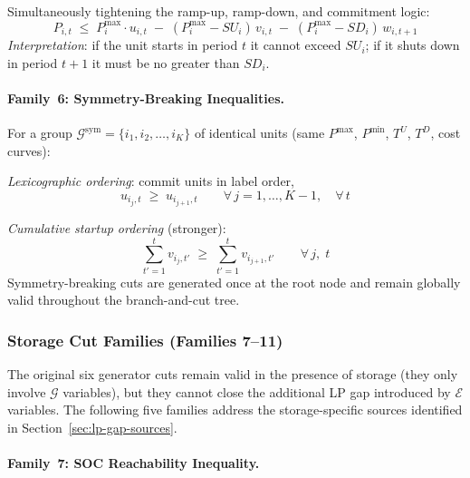 Simultaneously tightening the ramp-up, ramp-down, and commitment logic:
\begin{equation}\label{eq:cut-3period}
  \boxed{
    P_{i,t}
    \;\leq\;
    P^{\max}_i \cdot u_{i,t}
    \;-\; (P^{\max}_i - SU_i)\,v_{i,t}
    \;-\; (P^{\max}_i - SD_i)\,w_{i,t+1}
  }
\end{equation}
\textit{Interpretation}: if the unit starts in period $t$ it cannot exceed $SU_i$;
if it shuts down in period $t+1$ it must be no greater than $SD_i$.

\paragraph{Family~6: Symmetry-Breaking Inequalities.}

For a group $\mathcal{G}^{\mathrm{sym}} = \{i_1, i_2, \ldots, i_K\}$ of
identical units (same $P^{\max}$, $P^{\min}$, $T^U$, $T^D$, cost curves):

\emph{Lexicographic ordering}: commit units in label order,
\begin{equation}\label{eq:cut-sym-lex}
  u_{i_j,t} \;\geq\; u_{i_{j+1},t}
  \qquad \forall\, j=1,\ldots,K-1,\quad \forall\, t
\end{equation}

\emph{Cumulative startup ordering} (stronger):
\begin{equation}\label{eq:cut-sym-cumstart}
  \sum_{t'=1}^{t} v_{i_j,t'} \;\geq\; \sum_{t'=1}^{t} v_{i_{j+1},t'}
  \qquad \forall\, j,\; t
\end{equation}
Symmetry-breaking cuts are generated once at the root node and remain
globally valid throughout the branch-and-cut tree.

\subsubsection{Storage Cut Families (Families 7--11)}
\label{sec:storage-cuts}

The original six generator cuts remain valid in the presence of storage
(they only involve $\mathcal{G}$ variables), but they cannot close the
additional LP gap introduced by $\mathcal{E}$ variables.
The following five families address the storage-specific sources identified
in Section~\ref{sec:lp-gap-sources}.

\paragraph{Family~7: SOC Reachability Inequality.}

